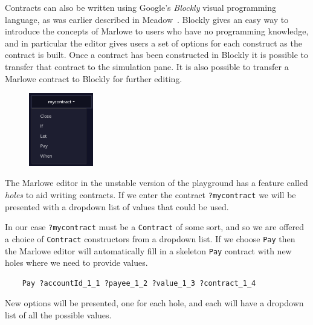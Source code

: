 \documentclass[runningheads]{llncs}
\renewcommand{\lstinline}[1]{\texttt{#1}}
\begin{document}
Contracts can also be written using Google's \emph{Blockly} visual programming language, as was earlier described in Meadow~\cite{isola-marlowe}. Blockly gives an easy way to introduce the concepts of Marlowe to users who have no programming knowledge, and in particular the editor gives users a set of options for each construct as the contract is built. Once a contract has been constructed in Blockly it is possible to transfer that contract to the simulation pane. It is also possible to transfer a Marlowe contract to Blockly for further editing.

\begin{figure}
    \includegraphics[width=0.25\textwidth]{hole_options.png}
\end{figure}

The Marlowe editor in the unstable version of the playground has a feature called \emph{holes} to aid writing contracts. If we enter the contract \lstinline{?mycontract}
we will be presented with a dropdown list of values that could be used.

In our case \lstinline{?mycontract} must be a \lstinline{Contract} of some sort, and so we are offered a choice of \lstinline{Contract} constructors from a dropdown list. If we choose \lstinline{Pay} then the Marlowe editor will automatically fill in a skeleton \lstinline{Pay} contract with new holes where we need to provide values.
\begin{verbatim}
    Pay ?accountId_1_1 ?payee_1_2 ?value_1_3 ?contract_1_4
\end{verbatim}
New options will be presented, one for each hole, and each will have a dropdown list of all the possible values.
\end{document}
